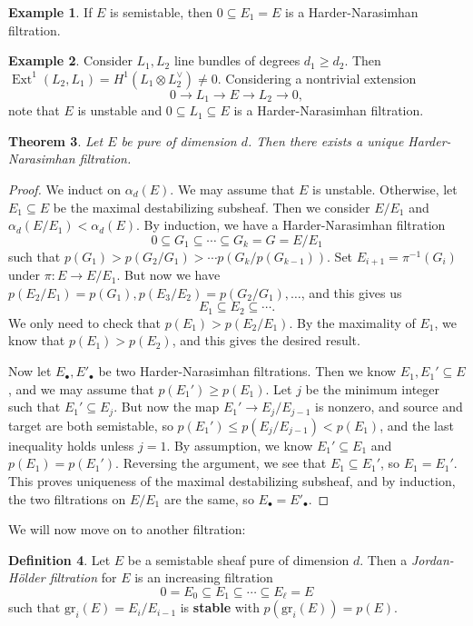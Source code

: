 \documentclass[leqno, openany]{memoir}
\newtheorem{thm}{Theorem}[section]
\theoremstyle{definition}
\newtheorem{defn}[thm]{Definition}
\newtheorem{exm}[thm]{Example}
\theoremstyle{remark}
\theoremstyle{plain}
\theoremstyle{definition}
\theoremstyle{remark}
\newcommand{\mr}[1]{\mathrm{#1}}
\DeclareMathOperator{\Ext}{Ext}
\begin{document}
\begin{exm}
    If $E$ is semistable, then $0 \subseteq E_1 = E$ is a Harder-Narasimhan filtration.
\end{exm}

\begin{exm}
    Consider $L_1, L_2$ line bundles of degrees $d_1 \geq d_2$. Then $\Ext^1(L_2, L_1) = H^1(L_1 \otimes L_2^{\vee}) \neq 0$. Considering a nontrivial extension
    \[ 0 \to L_1 \to E \to L_2 \to 0, \]
    note that $E$ is unstable and $0 \subseteq L_1 \subseteq E$ is a Harder-Narasimhan filtration.
\end{exm}

\begin{thm}
    Let $E$ be pure of dimension $d$. Then there exists a unique Harder-Narasimhan filtration.
\end{thm}

\begin{proof}
    We induct on $\alpha_d(E)$. We may assume that $E$ is unstable. Otherwise, let $E_1 \subseteq E$ be the maximal destabilizing subsheaf. Then we consider $E/E_1$ and $\alpha_d(E/E_1) < \alpha_d(E)$. By induction, we have a Harder-Narasimhan filtration
    \[ 0 \subseteq G_1 \subseteq \cdots \subseteq G_k = G = E / E_1 \]
    such that $p(G_1) > p(G_2 / G_1) > \cdots p(G_k / p(G_{k-1}))$. Set $E_{i+1} = \pi^{-1}(G_i)$ under $\pi \colon E \to E/E_1$. But now we have $p(E_2 / E_1) = p(G_1), p(E_3/E_2) = p(G_2/G_1), \ldots$, and this gives us
    \[ E_1 \subseteq E_2 \subseteq \cdots. \]
    We only need to check that $p(E_1) > p(E_2 / E_1)$. By the maximality of $E_1$, we know that $p(E_1) > p(E_2)$, and this gives the desired result.

    Now let $E_{\bullet}, E'_{\bullet}$ be two Harder-Narasimhan filtrations. Then we know $E_1, E_1' \subseteq E$, and we may assume that $p(E_1') \geq p(E_1)$. Let $j$ be the minimum integer such that $E_1' \subseteq E_j$. But now the map $E_1' \to E_j / E_{j-1}$ is nonzero, and source and target are both semistable, so $p(E_1') \leq p(E_j / E_{j-1}) < p(E_1)$, and the last inequality holds unless $j = 1$. By assumption, we know $E_1' \subseteq E_1$ and $p(E_1) = p(E_1')$. Reversing the argument, we see that $E_1 \subseteq E_1'$, so $E_1 = E_1'$. This proves uniqueness of the maximal destabilizing subsheaf, and by induction, the two filtrations on $E/E_1$ are the same, so $E_{\bullet} = E'_{\bullet}$.
\end{proof}

We will now move on to another filtration:
\begin{defn}
    Let $E$ be a semistable sheaf pure of dimension $d$. Then a \textit{Jordan-H\"older filtration} for $E$ is an increasing filtration
    \[ 0 = E_0 \subseteq E_1 \subseteq \cdots \subseteq E_{\ell} = E \]
    such that $\mr{gr}_i(E) = E_i / E_{i-1}$ is \textbf{stable} with $p(\mr{gr}_i(E)) = p(E)$.
\end{defn}
\end{document}
